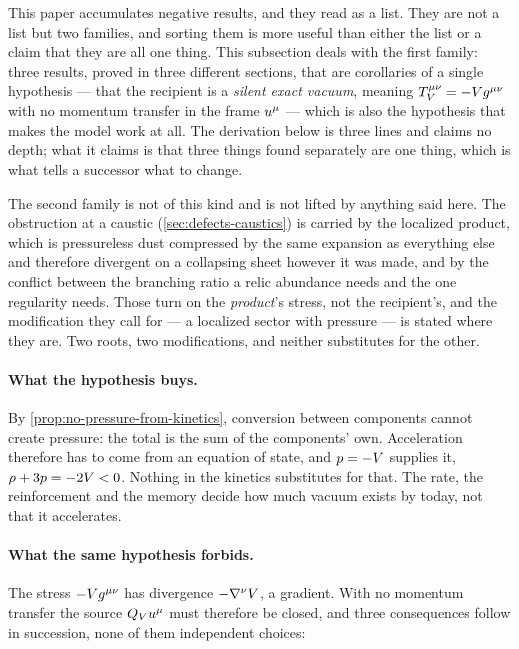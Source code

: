 This paper accumulates negative results, and they read as a list. They are not
a list but two families, and sorting them is more useful than either the list
or a claim that they are all one thing. This subsection deals with the first
family: three results, proved in three different sections, that are corollaries
of a single hypothesis --- that the recipient is a \emph{silent exact vacuum},
meaning $T^{\mu\nu}_V=-V g^{\mu\nu}$ with no momentum transfer in the frame
$u^{\mu}$ --- which is also the hypothesis that makes the model work at all. The
derivation below is three lines and claims no depth; what it claims is that
three things found separately are one thing, which is what tells a successor
what to change.

The second family is not of this kind and is not lifted by anything said here.
The obstruction at a caustic (\cref{sec:defects-caustics}) is carried by the
localized product, which is pressureless dust compressed by the same expansion
as everything else and therefore divergent on a collapsing sheet however it was
made, and by the conflict between the branching ratio a relic abundance needs
and the one regularity needs. Those turn on the \emph{product}'s stress, not
the recipient's, and the modification they call for --- a localized sector with
pressure --- is stated where they are. Two roots, two modifications, and
neither substitutes for the other.

\paragraph{What the hypothesis buys.} By
\cref{prop:no-pressure-from-kinetics}, conversion between components cannot
create pressure: the total is the sum of the components' own. Acceleration
therefore has to come from an equation of state, and $p=-V$ supplies it,
$\rho+3p=-2V<0$. Nothing in the kinetics substitutes for that. The rate,
the reinforcement and the memory decide how much vacuum exists by today, not
that it accelerates.

\paragraph{What the same hypothesis forbids.} The stress $-V g^{\mu\nu}$
has divergence $-\nabla^\nu V$, a gradient. With no momentum transfer the
source $Q_{V}u^{\mu}$ must therefore be closed, and three consequences follow in
succession, none of them independent choices:

